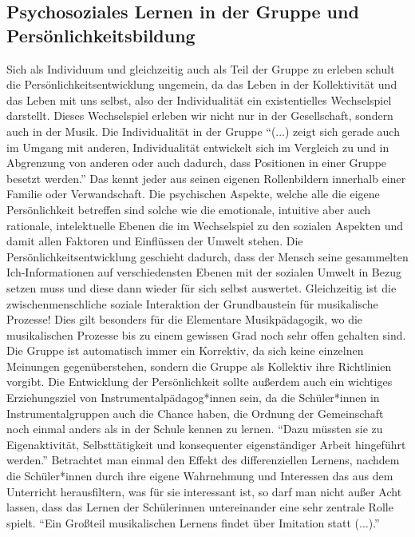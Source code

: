 \subsection{Psychosoziales Lernen in der Gruppe und Persönlichkeitsbildung}
Sich als Individuum und gleichzeitig auch als Teil der Gruppe zu erleben schult
die Persönlichkeitsentwicklung ungemein, da das Leben in der Kollektivität und
das Leben mit uns selbst, also der Individualität ein existentielles
Wechselspiel darstellt. Dieses Wechselspiel erleben wir nicht nur in der
Gesellschaft, sondern auch in der Musik. Die Individualität in der Gruppe \enquote{(...)
zeigt sich gerade auch im Umgang mit anderen, Individualität entwickelt sich im
Vergleich zu und in Abgrenzung von anderen oder auch dadurch, dass Positionen in
einer Gruppe besetzt werden.}\autocite[95]{ribke:emp}
Das kennt jeder aus seinen eigenen Rollenbildern innerhalb einer Familie oder
Verwandschaft. Die psychischen Aspekte, welche alle die eigene Persönlichkeit
betreffen sind solche wie die emotionale, intuitive aber auch rationale,
intelektuelle Ebenen die im Wechselspiel zu den sozialen Aspekten und damit
allen Faktoren und Einflüssen der Umwelt stehen. Die Persönlichkeitsentwicklung
geschieht dadurch, dass der Mensch seine gesammelten Ich-Informationen auf
verschiedensten Ebenen mit der sozialen Umwelt in Bezug setzen muss und diese
dann wieder für sich selbst auswertet. Gleichzeitig ist die zwischenmenschliche
soziale Interaktion der Grundbaustein für musikalische Prozesse!
Dies gilt besonders für die Elementare Musikpädagogik, wo die musikalischen
Prozesse bis zu einem gewissen Grad noch sehr offen gehalten sind. Die Gruppe
ist automatisch immer ein Korrektiv, da sich keine einzelnen Meinungen
gegenüberstehen, sondern die Gruppe als Kollektiv ihre Richtlinien vorgibt. Die
Entwicklung der Persönlichkeit sollte außerdem auch ein wichtiges Erziehungsziel
von Instrumentalpädagog*innen sein, da die Schüler*innen in Instrumentalgruppen auch die
Chance haben, die Ordnung der Gemeinschaft noch einmal anders als in der Schule
kennen zu lernen. \enquote{Dazu müssten sie zu Eigenaktivität, Selbsttätigkeit
und konsequenter eigenständiger Arbeit hingeführt
werden.}\autocite[64]{losert:die_kunst_zu_unterrichten} Betrachtet man einmal
den Effekt des differenziellen Lernens, nachdem die Schüler*innen durch ihre eigene
Wahrnehmung und Interessen das aus dem Unterricht herausfiltern, was für sie
interessant ist, so darf man nicht außer Acht lassen, dass das Lernen der
Schülerinnen untereinander eine sehr zentrale Rolle spielt. \enquote{Ein Großteil
musikalischen Lernens findet über Imitation statt
(...).}\autocite[98]{doerne:umfassend_musizieren}

